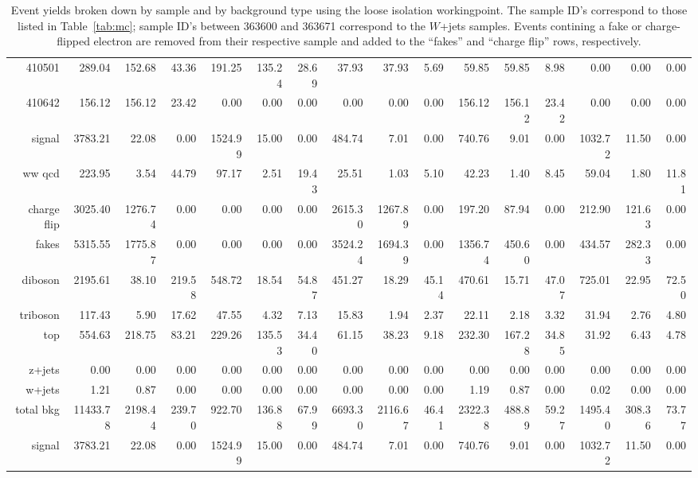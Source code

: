 \begin{sidewaystable}[!htbp]
{\begin{tabular}{r|rrr|rrr|rrr|rrr|rrr}
      410501&289.04&152.68&43.36&191.25&135.24&28.69&37.93&37.93&5.69&59.85&59.85&8.98&0.00&0.00&0.00\\
      
      410642&156.12&156.12&23.42&0.00&0.00&0.00&0.00&0.00&0.00&156.12&156.12&23.42&0.00&0.00&0.00\\
      \hline\hline
      signal&3783.21&22.08&0.00&1524.99&15.00&0.00&484.74&7.01&0.00&740.76&9.01&0.00&1032.72&11.50&0.00\\
      
      ww qcd&223.95&3.54&44.79&97.17&2.51&19.43&25.51&1.03&5.10&42.23&1.40&8.45&59.04&1.80&11.81\\
      
      charge flip&3025.40&1276.74&0.00&0.00&0.00&0.00&2615.30&1267.89&0.00&197.20&87.94&0.00&212.90&121.63&0.00\\
      
      fakes&5315.55&1775.87&0.00&0.00&0.00&0.00&3524.24&1694.39&0.00&1356.74&450.60&0.00&434.57&282.33&0.00\\
      
      diboson&2195.61&38.10&219.58&548.72&18.54&54.87&451.27&18.29&45.14&470.61&15.71&47.07&725.01&22.95&72.50\\
      
      triboson&117.43&5.90&17.62&47.55&4.32&7.13&15.83&1.94&2.37&22.11&2.18&3.32&31.94&2.76&4.80\\
      
      top&554.63&218.75&83.21&229.26&135.53&34.40&61.15&38.23&9.18&232.30&167.28&34.85&31.92&6.43&4.78\\
      
      z+jets&0.00&0.00&0.00&0.00&0.00&0.00&0.00&0.00&0.00&0.00&0.00&0.00&0.00&0.00&0.00\\
      
      w+jets&1.21&0.87&0.00&0.00&0.00&0.00&0.00&0.00&0.00&1.19&0.87&0.00&0.02&0.00&0.00\\
      \hline
      total bkg&11433.78&2198.44&239.70&922.70&136.88&67.99&6693.30&2116.67&46.41&2322.38&488.89&59.27&1495.40&308.36&73.77\\
      
      signal&3783.21&22.08&0.00&1524.99&15.00&0.00&484.74&7.01&0.00&740.76&9.01&0.00&1032.72&11.50&0.00\\
      \hline\hline
    \end{tabular}
  }
  \caption{Event yields broken down by sample and by background type using the loose isolation workingpoint.  The sample ID's correspond to those listed in Table~\ref{tab:mc}; sample ID's between 363600 and 363671 correspond to the $W$+jets samples.  Events contining a fake or charge-flipped electron are removed from their respective sample and added to the ``fakes'' and ``charge flip'' rows, respectively.}
  \label{tab:EY_loose}
\end{sidewaystable}
